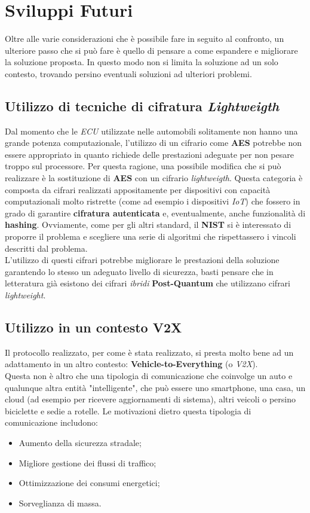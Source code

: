 \section{Sviluppi Futuri}
Oltre alle varie considerazioni che è possibile fare in seguito al confronto, un ulteriore passo che si può fare è quello di pensare a come espandere e migliorare la soluzione proposta. In questo modo non si limita la soluzione ad un solo contesto, trovando persino eventuali soluzioni ad ulteriori problemi.

\subsection{Utilizzo di tecniche di cifratura \emph{Lightweigth}}
Dal momento che le \emph{ECU} utilizzate nelle automobili solitamente non hanno una grande potenza computazionale, l'utilizzo di un cifrario come \textbf{AES} potrebbe non essere appropriato in quanto richiede delle prestazioni adeguate per non pesare troppo sul processore. Per questa ragione, una possibile modifica che si può realizzare è la sostituzione di \textbf{AES} con un cifrario \emph{lightweigth}. Questa categoria è composta da cifrari realizzati appositamente per dispositivi con capacità computazionali molto ristrette \cite{nist_lightweight} (come ad esempio i dispositivi \emph{IoT}) che fossero in grado di garantire \textbf{cifratura autenticata} e, eventualmente, anche funzionalità di \textbf{hashing}. Ovviamente, come per gli altri standard, il \textbf{NIST} si è interessato di proporre il problema e scegliere una serie di algoritmi che rispettassero i vincoli descritti dal problema.\\
L'utilizzo di questi cifrari potrebbe migliorare le prestazioni della soluzione garantendo lo stesso un adeguato livello di sicurezza, basti pensare che in letteratura già esistono dei cifrari \emph{ibridi} \textbf{Post-Quantum} che utilizzano cifrari \emph{lightweight}.

\subsection{Utilizzo in un contesto V2X}
Il protocollo realizzato, per come è stata realizzato, si presta molto bene ad un adattamento in un altro contesto: \textbf{Vehicle-to-Everything} (o \emph{V2X}).\\
Questa non è altro che una tipologia di comunicazione che coinvolge un auto e qualunque altra entità "intelligente", che può essere uno smartphone, una casa, un cloud (ad esempio per ricevere aggiornamenti di sistema), altri veicoli o persino biciclette e sedie a rotelle. Le motivazioni dietro questa tipologia di comunicazione includono:
\begin{itemize}
	\item Aumento della sicurezza stradale;
	\item Migliore gestione dei flussi di traffico;
	\item Ottimizzazione dei consumi energetici;
	\item Sorveglianza di massa. \cite{wikipedia_v2x}
\end{itemize}

